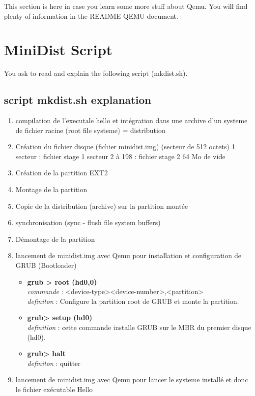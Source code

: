 \documentclass[10]{article}
\begin{document}
This section is here in case you learn some more stuff about Qemu.
You will find plenty of information in the README-QEMU document.

\section{MiniDist Script}

You ask to read and explain the following script (mkdist.sh).
\subsection{script mkdist.sh explanation }
\begin{enumerate}
\item 
compilation de l'executale hello et int\'egration dans une archive d'un systeme de fichier racine (root file systeme) = distribution
\item 
Cr\'eation du fichier disque (fichier minidist.img) (secteur de 512 octets)
	1 secteur : fichier stage 1
	secteur 2 \`a 198 : fichier stage 2 
	64 Mo de vide
\item Cr\'eation de la partition EXT2

\item Montage de la partition
\item Copie de la distribution (archive) sur la partition mont\'ee
\item synchronisation (sync - flush file system buffers)
\item D\'emontage de la partition
\item lancement de minidist.img avec Qemu pour installation et configuration de GRUB (Bootloader)
\begin{itemize}
\item \textbf{grub > root (hd0,0)}\\
\textit{commande} : <device-type><device-number>,<partition> \\
\textit{definiton} :   Configure la partition root de GRUB et monte la partition.
\item \textbf{grub> setup (hd0)} \\
\textit{definition} : cette commande installe GRUB sur le MBR du premier disque (hd0).
\item \textbf{grub> halt}\\
\textit{definiton} : quitter 
\end{itemize}
\item lancement de minidist.img avec Qemu pour lancer le systeme install\'e et donc le fichier ex\'ecutable Hello

\end{enumerate}
\end{document}
